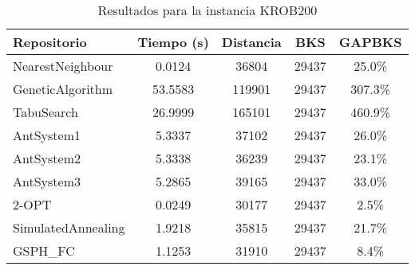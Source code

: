 \begin{table}[H]
\centering
\caption{Resultados para la instancia KROB200}
\begin{tabular}{|l|c|c|c|c|}
\hline
\textbf{Repositorio} & \textbf{Tiempo (s)} & \textbf{Distancia} & \textbf{BKS} & \textbf{GAPBKS} \\ 
\hline
NearestNeighbour & 0.0124 & 36804 & 29437 & 25.0\% \\ 
GeneticAlgorithm & 53.5583 & 119901 & 29437 & 307.3\% \\ 
TabuSearch & 26.9999 & 165101 & 29437 & 460.9\% \\ 
AntSystem1 & 5.3337 & 37102 & 29437 & 26.0\% \\ 
AntSystem2 & 5.3338 & 36239 & 29437 & 23.1\% \\ 
AntSystem3 & 5.2865 & 39165 & 29437 & 33.0\% \\ 
2-OPT & 0.0249 & 30177 & 29437 & 2.5\% \\ 
SimulatedAnnealing & 1.9218 & 35815 & 29437 & 21.7\% \\ 
GSPH_FC & 1.1253 & 31910 & 29437 & 8.4\% \\ 
\hline
\end{tabular}
\end{table}
